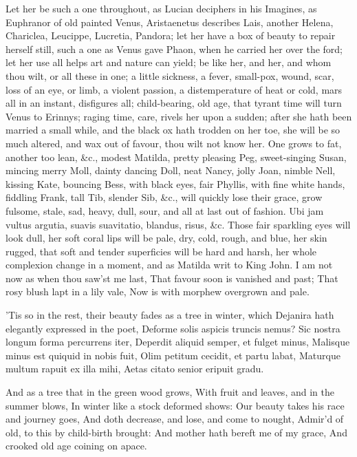 {Let her be such a one throughout, as Lucian deciphers in his Imagines,
as Euphranor of old painted Venus, Aristaenetus describes Lais, another
Helena, Chariclea, Leucippe, Lucretia, Pandora; let her have a box of
beauty to repair herself still, such a one as Venus gave Phaon, when he
carried her over the ford; let her use all helps art and nature can
yield; be like her, and her, and whom thou wilt, or all these in one; a
little sickness, a fever, small-pox, wound, scar, loss of an eye, or
limb, a violent passion, a distemperature of heat or cold, mars all in
an instant, disfigures all; child-bearing, old age, that tyrant time
will turn Venus to Erinnys; raging time, care, rivels her upon a
sudden; after she hath been married a small while, and the black ox
hath trodden on her toe, she will be so much altered, and wax out of
favour, thou wilt not know her. One grows to fat, another too lean,
\&c., modest Matilda, pretty pleasing Peg, sweet-singing Susan, mincing
merry Moll, dainty dancing Doll, neat Nancy, jolly Joan, nimble Nell,
kissing Kate, bouncing Bess, with black eyes, fair Phyllis, with fine
white hands, fiddling Frank, tall Tib, slender Sib, \&c., will quickly
lose their grace, grow fulsome, stale, sad, heavy, dull, sour, and all
at last out of fashion. Ubi jam vultus argutia, suavis suavitatio,
blandus, risus, \&c. Those fair sparkling eyes will look dull, her soft
coral lips will be pale, dry, cold, rough, and blue, her skin rugged,
that soft and tender superficies will be hard and harsh, her whole
complexion change in a moment, and as Matilda writ to King John.
I am not now as when thou saw'st me last,
That favour soon is vanished and past;
That rosy blush lapt in a lily vale,
Now is with morphew overgrown and pale.

'Tis so in the rest, their beauty fades as a tree in winter, which
Dejanira hath elegantly expressed in the poet,
Deforme solis aspicis truncis nemus?
Sic nostra longum forma percurrens iter,
Deperdit aliquid semper, et fulget minus,
Malisque minus est quiquid in nobis fuit,
Olim petitum cecidit, et partu labat,
Maturque multum rapuit ex illa mihi,
Aetas citato senior eripuit gradu.

And as a tree that in the green wood grows,
With fruit and leaves, and in the summer blows,
In winter like a stock deformed shows:
Our beauty takes his race and journey goes,
And doth decrease, and lose, and come to nought,
Admir'd of old, to this by child-birth brought:
And mother hath bereft me of my grace,
And crooked old age coining on apace.

}
